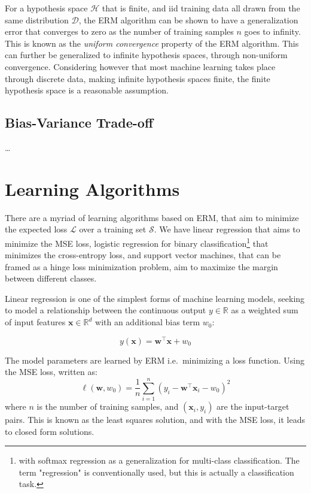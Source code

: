 For a hypothesis space $\mathcal{H}$ that is finite, and \gls{iid} training data all drawn from the same distribution $\mathcal{D}$, the \gls{ERM} algorithm can be shown to have a generalization error that converges to zero as the number of training samples $n$ goes to infinity. This is known as the \textit{uniform convergence} property of the \gls{ERM} algorithm. This can further be generalized to infinite hypothesis spaces, through non-uniform convergence. Considering however that most machine learning takes place through discrete data, making infinite hypothesis spaces finite, the finite hypothesis space is a reasonable assumption.

\subsection{Bias-Variance Trade-off}

\dots

\section{Learning Algorithms}
There are a myriad of learning algorithms based on \gls{ERM}, that aim to minimize the expected loss $\mathcal{L}$ over a training set $\mathcal{S}$.  We have linear regression that aims to minimize the \gls{MSE} loss, logistic regression for binary classification\footnote{with softmax regression as a generalization for multi-class classification. The term "regression" is conventionally used, but this is actually a classification task.} that minimizes the cross-entropy loss, and support vector machines, that can be framed as a hinge loss minimization problem, aim to maximize the margin between different classes.


Linear regression is one of the simplest forms of machine learning models, seeking to model a relationship between the continuous output $y \in \mathbb{R}$ as a weighted sum of input features $\mathbf{x} \in \mathbb{R}^d$ with an additional bias term $w_0$:

\begin{equation}\label{eq:linear-regression}
    y(\mathbf{x}) = \mathbf{w}^\top \mathbf{x} + w_0
\end{equation}

The model parameters are learned by \gls{ERM} i.e.\ minimizing a loss function. Using the \gls{MSE} loss, written as:
\begin{equation}\label{eq:mse-loss}
    \ell(\mathbf{w}, w_0) = \frac{1}{n} \sum_{i=1}^{n} (y_i - \mathbf{w}^\top \mathbf{x}_i - w_0)^2
\end{equation}
where $n$ is the number of training samples, and $(\mathbf{x}_i, y_i)$ are the input-target pairs. This is known as the least squares solution, and with the MSE loss, it leads to closed form solutions.

